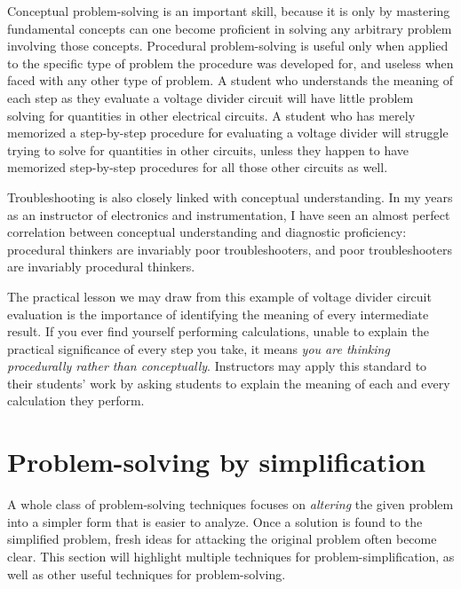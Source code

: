 \vskip 10pt

Conceptual problem-solving is an important skill, because it is only by mastering fundamental concepts can one become proficient in solving any arbitrary problem involving those concepts.  Procedural problem-solving is useful only when applied to the specific type of problem the procedure was developed for, and useless when faced with any other type of problem.  A student who understands the meaning of each step as they evaluate a voltage divider circuit will have little problem solving for quantities in other electrical circuits.  A student who has merely memorized a step-by-step procedure for evaluating a voltage divider will struggle trying to solve for quantities in other circuits, unless they happen to have memorized step-by-step procedures for all those other circuits as well.

Troubleshooting is also closely linked with conceptual understanding.  In my years as an instructor of electronics and instrumentation, I have seen an almost perfect correlation between conceptual understanding and diagnostic proficiency: procedural thinkers are invariably poor troubleshooters, and poor troubleshooters are invariably procedural thinkers.

\vskip 10pt

The practical lesson we may draw from this example of voltage divider circuit evaluation is the importance of identifying the meaning of every intermediate result.  If you ever find yourself performing calculations, unable to explain the practical significance of every step you take, it means \textit{you are thinking procedurally rather than conceptually}.  Instructors may apply this standard to their students' work by asking students to explain the meaning of each and every calculation they perform.







\filbreak
\section{Problem-solving by simplification}

A whole class of problem-solving techniques focuses on \textit{altering} the given problem into a simpler form that is easier to analyze.  Once a solution is found to the simplified problem, fresh ideas for attacking the original problem often become clear.  This section will highlight multiple techniques for problem-simplification, as well as other useful techniques for problem-solving.


